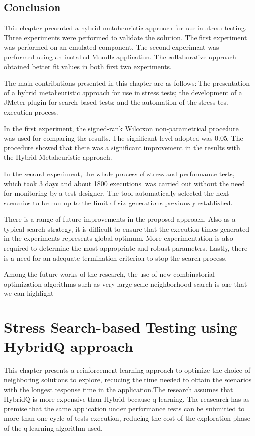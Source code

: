 \documentclass[espaco=umemeio,chapter=TITLE,twoside,openright]{abnt}
\begin{document}
\section{Conclusion}

This chapter presented a hybrid metaheuristic approach for use in stress testing. Three experiments were performed to validate the solution. The first experiment was performed on an emulated component. The second experiment was performed using an installed Moodle application.  The collaborative approach obtained better fit values in both first two experiments.

The main contributions presented in this chapter are as follows: The presentation of a hybrid metaheuristic approach for use in stress tests; the development of a JMeter plugin  for search-based tests; and  the automation of the stress test execution process.

In the first experiment, the signed-rank Wilcoxon non-parametrical procedure was used for comparing the results. The significant level adopted was 0.05. The procedure showed that there was a significant improvement in the results with the Hybrid Metaheuristic approach.

In the second experiment, the whole process of stress and performance tests, which took 3 days and about 1800 executions, was carried out without the need for monitoring by a test designer. The tool automatically selected the next scenarios to be run up to the limit of six generations previously established.

There is a range of future improvements in the proposed approach. Also as a typical search strategy, it is difficult to ensure that the execution times generated in the experiments represents global optimum. More experimentation is also required to determine the
most appropriate and robust parameters. Lastly, there is a need for an adequate termination criterion to stop the search process.

Among the future works of the research, the use of new combinatorial optimization algorithms such as very large-scale neighborhood search is one that we can highlight


\chapter{Stress Search-based Testing using HybridQ approach}


This chapter presents a reinforcement learning approach to optimize the choice of neighboring solutions to explore, reducing the time needed to obtain the scenarios with the longest response time in the application.The research assumes that HybridQ is more expensive than Hybrid because q-learning. The reasearch has as premise that the same application under performance tests can be submitted to more than one cycle of tests execution, reducing the cost of the exploration phase of the q-learning algorithm used. 
\end{document}
